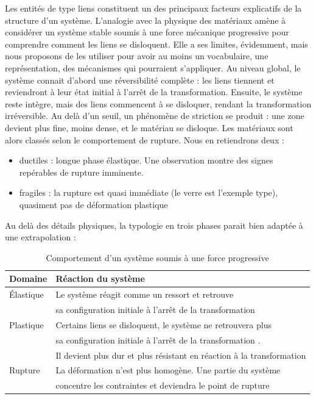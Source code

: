 \documentclass{report}
\begin{document}
	Les entités de type liens constituent un des principaux facteurs explicatifs de la structure d'un système. L'analogie avec la physique des matériaux amène à considérer un système stable soumis à une force mécanique progressive pour comprendre comment les liens se disloquent. Elle a ses limites, évidemment, mais nous proposons de les utiliser pour avoir au moins un vocabulaire, une représentation, des mécanismes qui pourraient s'appliquer. Au niveau global, le système connait d'abord une réversibilité complète : les liens tiennent et reviendront à leur état initial à l'arrêt de la transformation. Ensuite, le système reste intègre, mais des liens commencent à se disloquer, rendant la transformation irréversible. Au delà d'un seuil, un phénomène de striction se produit : une zone devient plus fine, moins dense, et le matériau se disloque. Les matériaux sont alors classés selon le comportement de rupture. Nous en retiendrons deux : 
	\begin{itemize}
		\item ductiles : longue phase élastique. Une observation montre des signes repérables de rupture imminente. 
		\item fragiles : la rupture est quasi immédiate (le verre est l'exemple type), quasiment pas de déformation plastique
	\end{itemize}
	
	Au delà des détails physiques, la typologie en trois phases parait bien adaptée à une extrapolation : 
	
	\begin{table}[H]
		\centering
		\begin{tabular}{|l|l|}
			\hline 
			\textbf{Domaine} & \textbf{Réaction du système} \\
			\hline 
			Élastique & Le système réagit comme un ressort et retrouve \\
			& sa configuration initiale à l'arrêt de la transformation \\
			\hline 
			Plastique & Certains liens se disloquent, le système ne retrouvera plus \\
			& sa configuration initiale à l'arrêt de la transformation . \\
			& Il devient plus dur et plus résistant en réaction à la transformation \\
			\hline 
			Rupture & La déformation n'est plus homogène. Une partie du système \\
			& concentre les contraintes et deviendra le point de rupture \\ 
			\hline 
		\end{tabular}
		\caption{Comportement d'un système soumis à une force progressive}
	\end{table}	
	
\end{document}
